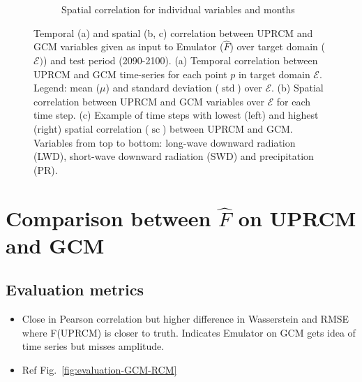 \documentclass[a4paper,11pt,oneside]{report}
\begin{document}
\begin{figure}[tbp]
\begin{subfigure}[b]{\columnwidth}
            {{\small Spatial correlation for individual variables and months}}  \label{fig:spatial-corr-GCM-RCM-ex}
        \end{subfigure}
        \hfill
        \caption[]
        {\small Temporal (a) and spatial (b, c) correlation between UPRCM and GCM variables given as input to Emulator ($\hat{F}$) over target domain ($\mathcal{E})$) and test period (2090-2100). (a) Temporal correlation between UPRCM and GCM time-series for each point $p$ in target domain $\mathcal{E}$. Legend: mean ($\mu$) and standard deviation ($\operatorname{std}$) over $\mathcal{E}$. (b) Spatial correlation between UPRCM and GCM variables over $\mathcal{E}$ for each time step. (c) Example of time steps with lowest (left) and highest (right) spatial correlation ($\operatorname{sc}$) between UPRCM and GCM. Variables from top to bottom: long-wave downward radiation (LWD), short-wave downward radiation (SWD) and precipitation (PR).} 
        \label{fig:corr-GCM-RCM}
    \end{figure}





\section{Comparison between $\hat{F}$ on UPRCM and GCM}

\subsection{Evaluation metrics}

\begin{itemize}
    \item Close in Pearson correlation but higher difference in Wasserstein and RMSE where F(UPRCM) is closer to truth. Indicates Emulator on GCM gets idea of time series but misses amplitude.
    \item Ref Fig.~\ref{fig:evaluation-GCM-RCM}
\end{itemize}
\end{document}
